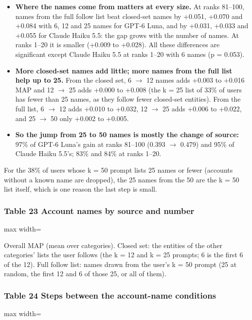 \documentclass[10pt]{article}
\begin{document}
\begin{itemize}
  \item \textbf{Where the names come from matters at every size.} At ranks 81--100, names from the full follow list beat closed-set names by +0.051, +0.070 and +0.084 with 6, 12 and 25 names for GPT-6 Luna, and by +0.031, +0.033 and +0.055 for Claude Haiku 5.5: the gap grows with the number of names. At ranks 1--20 it is smaller (+0.009 to +0.028). All these differences are significant except Claude Haiku 5.5 at ranks 1--20 with 6 names (p = 0.053).
  \item \textbf{More closed-set names add little; more names from the full list help up to 25.} From the closed set, 6 $\rightarrow$ 12 names adds +0.003 to +0.016 MAP and 12 $\rightarrow$ 25 adds +0.000 to +0.008 (the k = 25 list of 33\% of users has fewer than 25 names, as they follow fewer closed-set entities). From the full list, 6 $\rightarrow$ 12 adds +0.010 to +0.032, 12 $\rightarrow$ 25 adds +0.006 to +0.022, and 25 $\rightarrow$ 50 only +0.002 to +0.005.
  \item \textbf{So the jump from 25 to 50 names is mostly the change of source:} 97\% of GPT-6 Luna's gain at ranks 81--100 (0.393 $\rightarrow$ 0.479) and 95\% of Claude Haiku 5.5's; 83\% and 84\% at ranks 1--20.
\end{itemize}
For the 38\% of users whose k = 50 prompt lists 25 names or fewer (accounts without a known name are dropped), the 25 names from the 50 are the k = 50 list itself, which is one reason the last step is small.

\subsubsection*{Table 23 \textperiodcentered{} Account names by source and number}
\begin{center}\begin{adjustbox}{max width=\linewidth}

\end{adjustbox}\end{center}

{\small Overall MAP (mean over categories). Closed set: the entities of the other categories' lists the user follows (the k = 12 and k = 25 prompts; 6 is the first 6 of the 12). Full follow list: names drawn from the user's k = 50 prompt (25 at random, the first 12 and 6 of those 25, or all of them).}

\subsubsection*{Table 24 \textperiodcentered{} Steps between the account-name conditions}
\begin{center}\begin{adjustbox}{max width=\linewidth}

\end{adjustbox}\end{center}
\end{document}
